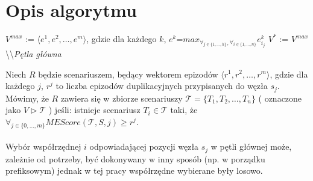 \documentclass[licencjacka]{pracamgr}
\begin{document}
\section{Opis algorytmu}
\begin{algorithm}[H]
 $V^{max}$ := $\langle {e}^1,{e}^2, \dots , {e}^m \rangle$, gdzie dla każdego $k$, ${e}^k$=$max_{ \forall_{j \in \{1,\dots,h\}},\forall_{i \in \{1,\dots,n\}}}e^k_{i_j}$\;
 $V^*$ := $V^{max}$\;
 \textbackslash\textbackslash \textit{Pętla główna}\;
\end{algorithm}


Niech $R$ będzie scenariuszem, będący wektorem epizodów $\langle r^1,r^2, \dots , r^m \rangle$, gdzie dla każdego $j$, $r^j$ to liczba epizodów duplikacyjnych przypisanych do węzła $s_j$. Mówimy, że $R$ zawiera się w zbiorze scenariuszy $\mathcal{T}=\{T_1,T_2, \dots , T_n\}$ ( oznaczone jako $V \triangleright \mathcal{T}$ ) jeśli: istnieje scenariusz ${T_i \in \mathcal{T}}$ taki, że $\forall_{j \in \{0,\dots,m\}}MEScore(\mathcal{T},S,j) \geq r^j$.
\\
~\\
Wybór współrzędnej $i$ odpowiadającej pozycji węzła $s_j$ w pętli głównej może, zależnie od potrzeby, być dokonywany w inny sposób (np. w porządku prefiksowym) jednak w tej pracy współrzędne wybierane były losowo.
\end{document}
